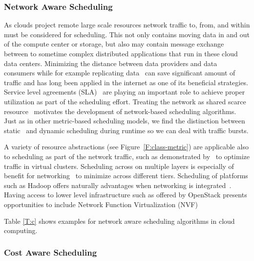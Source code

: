 \documentclass[final,5p,times,twocolumn]{elsarticle}
\begin{document}


\subsubsection{Network Aware Scheduling}\label{sec:network}




As clouds project remote large scale resources network traffic to,
from, and within must be considered for scheduling. This not only
contains moving data in and out of the compute center or storage, but
also may contain message exchange between to sometime complex
distributed applications that run in these cloud data
centers. Minimizing the distance between data providers and data
consumers while for example replicating data~\cite{www-akamai} can save
significant amount of traffic and has long been applied in the
internet as one of its beneficial strategies. Service level agreements
(SLA)~\cite{breitgand2012improving} are playing an important role to
achieve proper utilization as part of the scheduling effort. Treating
the network as shared scarce resource~\cite{rampersaud2016sharing}
motivates the development of network-based scheduling algorithms.
Just as in other metric-based scheduling models, we find the
distinction between static~\cite{biran2012stable} and dynamic
scheduling during runtime so we can deal with traffic bursts.

A variety of resource abstractions (see Figure~\ref{F:class-metric}) are
applicable also to scheduling as part of the network traffic, such as
demonstrated by~\cite{yu2017survivable} to optimize traffic in virtual
clusters.  Scheduling across on multiple layers is especially of
benefit for networking~\cite{bi2015sla} to minimize across different
tiers.  Scheduling of platforms such as Hadoop offers naturally
advantages when networking is integrated~\cite{kondikoppa2012network}.  Having access to lower level infrastructure
such as offered by OpenStack presents opportunities to include Network
Function Virtualization (NVF)~\cite{lucrezia2015introducing}

Table \ref{T:c} shows examples for network aware scheduling algorithms
in cloud computing.






\subsubsection{Cost Aware Scheduling}\label{sec:cost}
\end{document}
